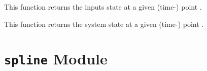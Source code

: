 \documentclass[letterpaper,10pt,english]{sphinxmanual}
\begin{document}
\begin{fulllineitems}
\begin{fulllineitems}
\label{pytrajectory:pytrajectory.trajectory.Trajectory.u}
This function returns the inputs state at a given (time-) point .

\end{fulllineitems}


\begin{fulllineitems}
\label{pytrajectory:pytrajectory.trajectory.Trajectory.x}
This function returns the system state at a given (time-) point .

\end{fulllineitems}


\end{fulllineitems}



\section{\texttt{spline} Module}
\label{pytrajectory:spline-module}\label{pytrajectory:module-pytrajectory.spline}
\end{document}
